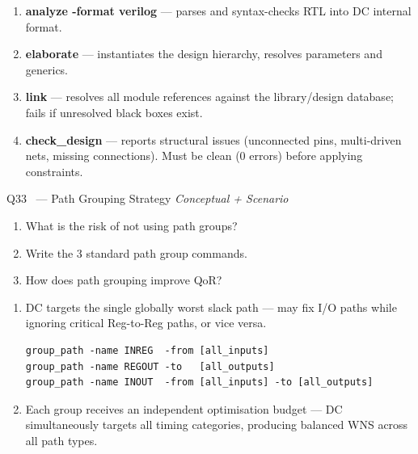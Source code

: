 \documentclass[12pt,a4paper]{article}
\newcommand{\advanced}{%
  \fbox{\textcolor{advred}{\bfseries\sffamily\small ADVANCED}}}
\begin{document}
\begin{answerbox}
\begin{enumerate}
  \item \textbf{analyze -format verilog} --- parses and syntax-checks RTL into DC internal format.
  \item \textbf{elaborate} --- instantiates the design hierarchy, resolves parameters and generics.
  \item \textbf{link} --- resolves all module references against the library/design database; fails if unresolved black boxes exist.
  \item \textbf{check\_design} --- reports structural issues (unconnected pins, multi-driven nets, missing connections). Must be clean (0 errors) before applying constraints.
\end{enumerate}
\end{answerbox}

\begin{questionbox}{Q33 \advanced\ --- Path Grouping Strategy \hfill\textit{Conceptual + Scenario}}
\begin{enumerate}[label=\textbf{\alph*)}]
  \item What is the risk of not using path groups?
  \item Write the 3 standard path group commands.
  \item How does path grouping improve QoR?
\end{enumerate}
\end{questionbox}

\begin{answerbox}
\begin{enumerate}[label=\textbf{\alph*)}]
  \item DC targets the single globally worst slack path --- may fix I/O paths while ignoring critical Reg-to-Reg paths, or vice versa.
\begin{lstlisting}[style=tclstyle]
group_path -name INREG  -from [all_inputs]
group_path -name REGOUT -to   [all_outputs]
group_path -name INOUT  -from [all_inputs] -to [all_outputs]
\end{lstlisting}
  \item Each group receives an independent optimisation budget --- DC simultaneously targets all timing categories, producing balanced WNS across all path types.
\end{enumerate}
\end{answerbox}
\end{document}
